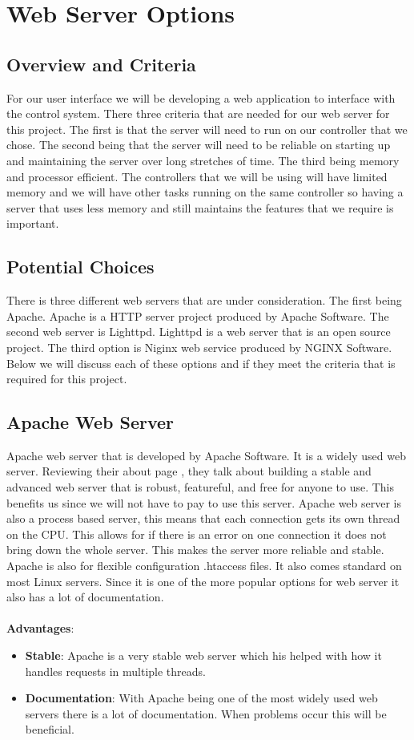 \section{Web Server Options}
	\subsection{Overview and Criteria}
	For our user interface we will be developing a web application to interface
	with the control system. There three criteria that are needed for our web
	server for this project. The first is that the server will need to run on
	our controller that we chose. The second being that the server will need to
	be reliable on starting up and maintaining the server over long stretches of
	time. The third being memory and processor efficient. The controllers that
	we will be using will have limited memory and we will have other tasks
	running on the same controller so having a server that uses less memory and
	still maintains the features that we require is important.
	\subsection{Potential Choices }
	There is three different web servers that are under consideration. The first
	being Apache. Apache is a HTTP server project produced by Apache Software. The
	second web server is Lighttpd. Lighttpd is a web server that is an open source
	project. The third option is Niginx web service produced by NGINX Software.
	Below we will discuss each of these options and if they meet the criteria
	that is required for this project.
	\subsection{Apache Web Server}
	Apache web server that is developed by Apache Software. It is a widely used
	web server. Reviewing their about page \cite{Apache}, they talk about
	building a stable and advanced web server that is robust, featureful, and
	free for anyone to use. This benefits us since we will not have to pay to use
	this server. Apache web server is also a process based server, this means
	that each connection gets its own thread on the CPU. This allows for if there
	is an error on one connection it does not bring down the whole server. This
	makes the server more reliable and stable. Apache is also for flexible configuration
	.htaccess files. It also comes standard on most Linux servers. Since it is
	one of the more popular options for web server it also has a lot of documentation.
	\\\\
	\textbf{Advantages}:
	\begin{itemize}
		\item \textbf{Stable}: Apache is a very stable web server which his helped
		with how it handles requests in multiple threads.

		\item \textbf{Documentation}: With Apache being one of the most widely used
		web servers there is a lot of documentation. When problems occur this will
		be beneficial.
	\end{itemize}

